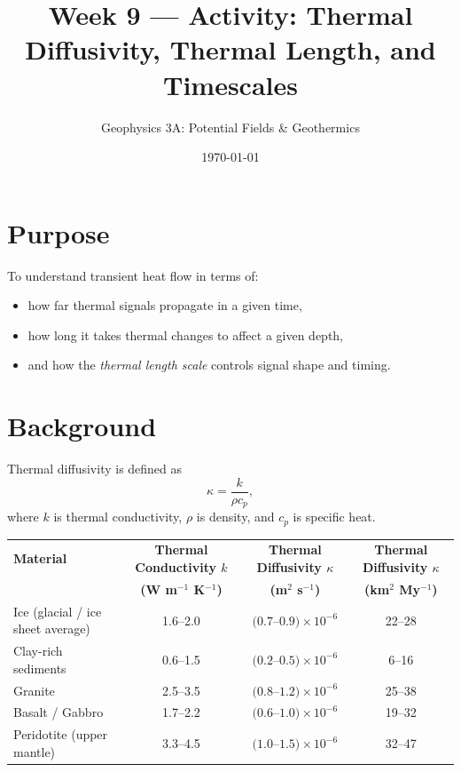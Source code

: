 \documentclass[11pt,a4paper]{article}
\title{Week 9 --- Activity: Thermal Diffusivity, Thermal Length, and Timescales}
\author{Geophysics 3A: Potential Fields \& Geothermics}
\date{\today}
\begin{document}
\maketitle

\vspace{1em}

\section*{Purpose}
To understand transient heat flow in terms of:
\begin{itemize}
  \item how far thermal signals propagate in a given time,
  \item how long it takes thermal changes to affect a given depth,
  \item and how the \emph{thermal length scale} controls signal shape and timing.
\end{itemize}


\section*{Background}
Thermal diffusivity is defined as
\[
\kappa = \frac{k}{\rho c_p},
\]
where $k$ is thermal conductivity, $\rho$ is density, and $c_p$ is specific heat.

\begin{table}
    \centering
    \begin{tabular}{lccc}
        \toprule
        \textbf{Material} &
        \textbf{Thermal Conductivity $k$} &
        \textbf{Thermal Diffusivity $\kappa$} &
        \textbf{Thermal Diffusivity $\kappa$} \\
        &
        \textbf{(W m$^{-1}$ K$^{-1}$)} &
        \textbf{(m$^2$ s$^{-1}$)} &
        \textbf{(km$^2$ My$^{-1}$)} \\
        \midrule
        Ice (glacial / ice sheet average) &
        1.6--2.0 &
        $(0.7$--$0.9)\times10^{-6}$ &
        22--28 \\

        Clay-rich sediments &
        0.6--1.5 &
        $(0.2$--$0.5)\times10^{-6}$ &
        6--16 \\

        Granite &
        2.5--3.5 &
        $(0.8$--$1.2)\times10^{-6}$ &
        25--38 \\

        Basalt / Gabbro &
        1.7--2.2 &
        $(0.6$--$1.0)\times10^{-6}$ &
        19--32 \\

        Peridotite (upper mantle) &
        3.3--4.5 &
        $(1.0$--$1.5)\times10^{-6}$ &
        32--47 \\
        \bottomrule
    \end{tabular}
\end{table}
\end{document}
